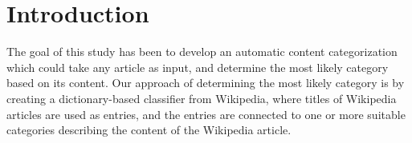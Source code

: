 \chapter{Introduction}
The goal of this study has been to develop an automatic content categorization which could take any article as input, and determine the most likely category based on its content. Our approach of determining the most likely category is by creating a dictionary-based classifier from Wikipedia, where titles of Wikipedia articles are used as entries, and the entries are connected to one or more suitable categories describing the content of the Wikipedia article. 





%
